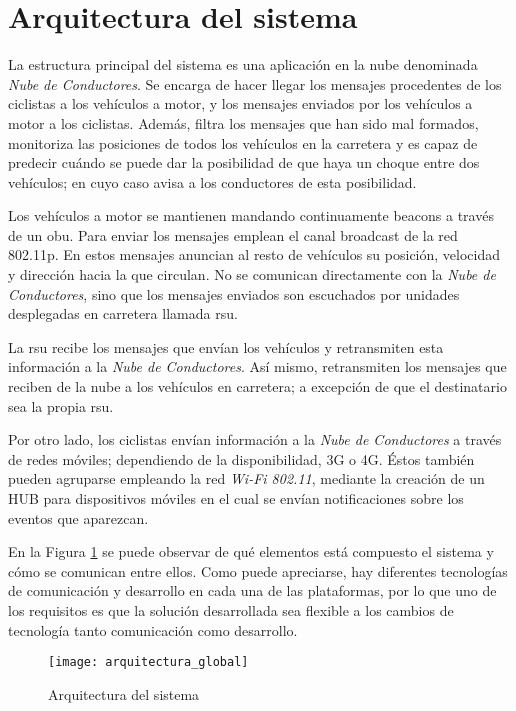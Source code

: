 \section{Arquitectura del sistema}\label{section:arquitecturaSistema}
La estructura principal del sistema es una aplicación en la nube denominada \emph{Nube de Conductores}. Se encarga de hacer llegar los mensajes procedentes de los ciclistas a los vehículos a motor, y los mensajes enviados por los vehículos a motor a los ciclistas. Además, filtra los mensajes que han sido mal formados, monitoriza las posiciones de todos los vehículos en la carretera y es capaz de predecir cuándo se puede dar la posibilidad de que haya un choque entre dos vehículos; en cuyo caso avisa a los conductores de esta posibilidad.

Los vehículos a motor se mantienen mandando continuamente beacons a través de un \gls{obu}. Para enviar los mensajes emplean el canal broadcast de la red 802.11p. En estos mensajes anuncian al resto de vehículos su posición, velocidad y dirección hacia la que circulan. No se comunican directamente con la \emph{Nube de Conductores}, sino que los mensajes enviados son escuchados por unidades desplegadas en carretera llamada \gls{rsu}.

La \gls{rsu} recibe los mensajes que envían los vehículos y retransmiten esta información a la \emph{Nube de Conductores}. Así mismo, retransmiten los mensajes que reciben de la nube a los vehículos en carretera; a excepción de que el destinatario sea la propia \gls{rsu}.

Por otro lado, los ciclistas envían información a la \emph{Nube de Conductores} a través de redes móviles; dependiendo de la disponibilidad, 3G o 4G. Éstos también pueden agruparse empleando la red \emph{Wi-Fi 802.11}, mediante la creación de un HUB para dispositivos móviles en el cual se envían notificaciones sobre los eventos que aparezcan.

En la Figura \ref{fig:ArquitecturaSistema} se puede observar de qué elementos está compuesto el sistema y cómo se comunican entre ellos. Como puede apreciarse, hay diferentes tecnologías de comunicación y desarrollo en cada una de las plataformas, por lo que uno de los requisitos es que la solución desarrollada sea flexible a los cambios de tecnología tanto comunicación como desarrollo.

\begin{figure}[H]
	\begin{center}
		\texttt{[image: arquitectura\_global]}
		\caption{Arquitectura del sistema}
		\label{fig:ArquitecturaSistema}
	 \end{center}
\end{figure}



